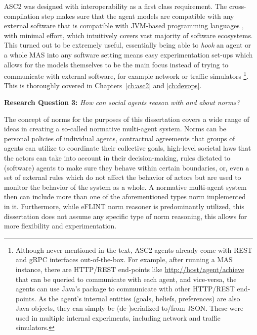ASC2 was designed with interoperability as a first class requirement. The cross-compilation step makes sure that the agent models are compatible with any external software that is compatible with JVM-based programming languages , with minimal effort, which intuitively covers vast majority of software ecosystems. This turned out to be extremely useful, essentially being able to \textit{hook} an agent or a whole MAS into any software setting means easy experimentation set-ups which allows for the models themselves to be the main focus instead of trying to communicate with external software, for example network or traffic simulators \footnote{Although never mentioned in the text, ASC2 agents already come with REST and gRPC interfaces out-of-the-box. For example, after running a MAS instance, there are HTTP/REST end-points like \url{http://host/agent/achieve} that can be queried to communicate with each agent, and vice-versa, the agents can use Java's  package to communicate with other HTTP/REST end-points. As the agent's internal entities (goals, beliefs, preferences) are also Java objects, they can simply be (de-)serialized to/from JSON. These were used in multiple internal experiments, including network and traffic simulators.}. This is thoroughly covered in Chapters~\ref{ch:asc2} and \ref{ch:devops}.


\begin{displayquote}
\textbf{Research Question 3:} \textit{How can social agents reason with and about norms?}   
\end{displayquote}

The concept of norms for the purposes of this dissertation covers a wide range of ideas in creating a so-called normative multi-agent system. Norms can be personal policies of individual agents, contractual agreements that groups of agents can utilize to coordinate their collective goals, high-level societal laws that the actors can take into account in their decision-making, rules dictated to (software) agents to make sure they behave within certain boundaries, or, even  a set of external rules which do not affect the behavior of actors but are used to monitor the behavior of the system as a whole. A normative multi-agent system then can include more than one of the aforementioned types norm implemented in it. Furthermore, while eFLINT norm reasoner is predominantly utilized, this dissertation does not assume any specific type of norm reasoning, this allows for more flexibility and experimentation.


